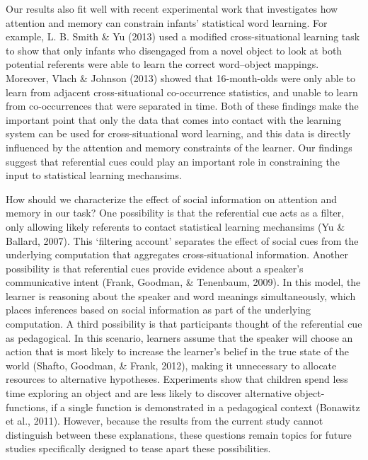 \documentclass[authoryear, review]{elsarticle}
\begin{document}
Our results also fit well with recent experimental work that
investigates how attention and memory can constrain infants' statistical
word learning. For example, L. B. Smith \& Yu (2013) used a modified
cross-situational learning task to show that only infants who disengaged
from a novel object to look at both potential referents were able to
learn the correct word--object mappings. Moreover, Vlach \& Johnson
(2013) showed that 16-month-olds were only able to learn from adjacent
cross-situational co-occurrence statistics, and unable to learn from
co-occurrences that were separated in time. Both of these findings make
the important point that only the data that comes into contact with the
learning system can be used for cross-situational word learning, and
this data is directly influenced by the attention and memory constraints
of the learner. Our findings suggest that referential cues could play an
important role in constraining the input to statistical learning
mechansims.

How should we characterize the effect of social information on attention
and memory in our task? One possibility is that the referential cue acts
as a filter, only allowing likely referents to contact statistical
learning mechansims (Yu \& Ballard, 2007). This `filtering account'
separates the effect of social cues from the underlying computation that
aggregates cross-situational information. Another possibility is that
referential cues provide evidence about a speaker's communicative intent
(Frank, Goodman, \& Tenenbaum, 2009). In this model, the learner is
reasoning about the speaker and word meanings simultaneously, which
places inferences based on social information as part of the underlying
computation. A third possibility is that participants thought of the
referential cue as pedagogical. In this scenario, learners assume that
the speaker will choose an action that is most likely to increase the
learner's belief in the true state of the world (Shafto, Goodman, \&
Frank, 2012), making it unnecessary to allocate resources to alternative
hypotheses. Experiments show that children spend less time exploring an
object and are less likely to discover alternative object-functions, if
a single function is demonstrated in a pedagogical context (Bonawitz et
al., 2011). However, because the results from the current study cannot
distinguish between these explanations, these questions remain topics
for future studies specifically designed to tease apart these
possibilities.
\end{document}
